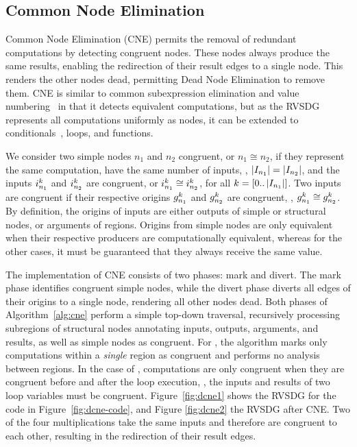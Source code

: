 \subsection{Common Node Elimination}\label{sec:cne}
Common Node Elimination (CNE) permits the removal of redundant computations by detecting congruent
nodes. These nodes always produce the same results, enabling the redirection of their result edges
to a single node. This renders the other nodes dead, permitting Dead Node Elimination to remove
them. CNE is similar
to common subexpression elimination and value numbering~\cite{Alpern88} in that it detects
equivalent computations, but as the RVSDG represents all computations uniformly as nodes, it can
be extended to conditionals~\cite{Rugina00}, loops, and functions.

We consider two simple nodes $n_1$ and $n_2$ congruent, or $n_1 \cong n_2$, if they represent the
same computation, have the same number of inputs, \ie, $\card{I_{n_1}} = \card{I_{n_2}}$, and the
inputs $\iput{k}{n_1}$ and $\iput{k}{n_2}$ are congruent, or $\iput{k}{n_1} \cong \iput{k}{n_2}$,
for all $k = [0..\card{I_{n_1}}]$. Two inputs are congruent if their respective origins
$\origin{k}{n_1}$ and $\origin{k}{n_2}$ are congruent, \ie, $\origin{k}{n_1} \cong
\origin{k}{n_2}$. By definition, the origins of inputs are either outputs of simple or structural
nodes, or arguments of regions. Origins from simple nodes are only equivalent when their respective
producers are computationally equivalent, whereas for the other cases, it must be guaranteed that
they always receive the same value.

The implementation of CNE consists of two phases: mark and divert. The mark phase identifies
congruent simple nodes, while the divert phase diverts all edges of their origins to
a single node, rendering all other nodes dead. Both phases of Algorithm~\ref{alg:cne} perform a
simple top-down traversal, recursively processing subregions of structural nodes
annotating inputs, outputs, arguments, and results, as well as simple nodes as congruent. For
\gammanodes, the algorithm marks only computations within a \emph{single} region as congruent and
performs no analysis between regions. In the case of \thetanodes, computations are only congruent
when they are congruent before and after the loop execution, \ie, the inputs and results of two
loop variables must be congruent.
Figure~\ref{fig:dcne1} shows the RVSDG for the code in Figure~\ref{fig:dcne-code}, and Figure
\ref{fig:dcne2} the RVSDG after CNE. Two of the four multiplications take the same inputs and
therefore are congruent to each other, resulting in the redirection of their result edges.

